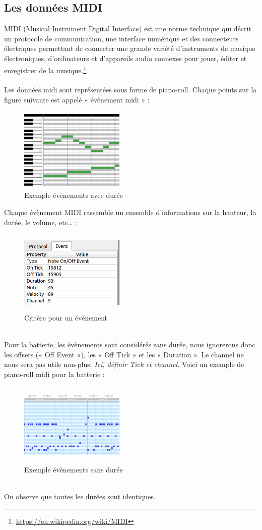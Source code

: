 \subsection{Les données MIDI}
MIDI (Musical Instrument Digital Interface) est une norme technique qui décrit un protocole de communication, une interface numérique et des connecteurs électriques permettant de connecter une grande variété d'instruments de musique électroniques, d'ordinateurs et d'appareils audio connexes pour jouer, éditer et enregistrer de la musique.\footnote{\url{https://en.wikipedia.org/wiki/MIDI}}\\\\
Les données midi sont représentées sous forme de piano-roll. Chaque points sur la figure suivante est appelé « évènement midi » :
\begin{figure}[h]
	\includegraphics[height=40mm, width=50mm]{z_images/2_midi/exemple_midi_piano.jpg}
	\caption{Exemple évènements avec durée}
\end{figure}
\newpage
Chaque évènement MIDI rassemble un ensemble d’informations sur la hauteur, la durée, le volume, etc… :
\begin{figure}[h]
	\includegraphics[height=40mm, width=50mm]{z_images/2_midi/representation_numerique_1.png}
	\caption{Critère pour un évènement}
\end{figure}\\
Pour la batterie, les évènements sont considérés sans durée, nous ignorerons donc les offsets (« Off Event »), les « Off Tick » et les « Duration ». Le channel ne nous sera pas utile non-plus.
\textit{Ici, définir Tick et channel.}
Voici un exemple de piano-roll midi pour la batterie :
\begin{figure}[h]
	\includegraphics[height=40mm, width=50mm]{z_images/2_midi/representation_numerique_0.png}
	\caption{Exemple évènements sans durée}
\end{figure}\\
On observe que toutes les durées sont identiques.
